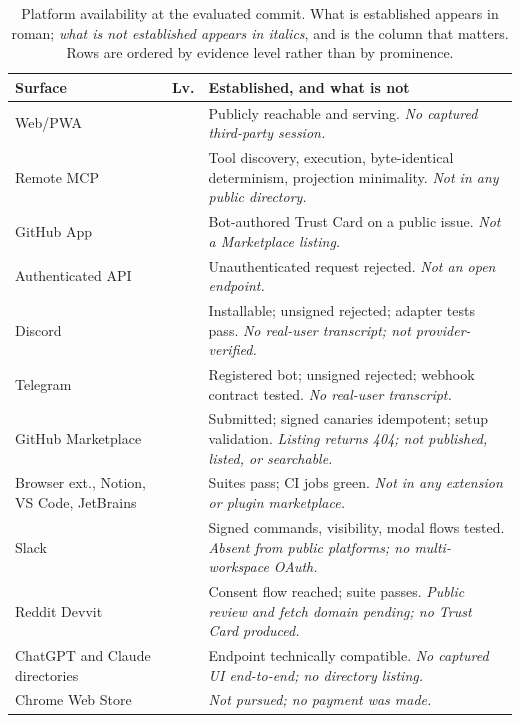 \begin{table}[!b]
\centering
\small
\caption{Platform availability at the evaluated commit. What is established appears in
roman; \emph{what is not established appears in italics}, and is the column that matters.
Rows are ordered by evidence level rather than by prominence.}
\label{tab:platforms}
\setlength{\tabcolsep}{4pt}
\renewcommand{\arraystretch}{1.18}
\begin{tabular}{@{}L{0.245\columnwidth}cL{0.615\columnwidth}@{}}
\toprule
\textbf{Surface} & \textbf{Lv.} & \textbf{Established, and what is not} \\
\midrule
Web/PWA &  & Publicly reachable and serving.
  \emph{No captured third-party session.} \\
Remote MCP &  & Tool discovery, execution, byte-identical determinism, projection
  minimality. \emph{Not in any public directory.} \\
GitHub App &  & Bot-authored Trust Card on a public issue.
  \emph{Not a Marketplace listing.} \\
\midrule
Authenticated API &  & Unauthenticated request rejected.
  \emph{Not an open endpoint.} \\
Discord &  & Installable; unsigned rejected; adapter tests pass.
  \emph{No real-user transcript; not provider-verified.} \\
Telegram &  & Registered bot; unsigned rejected; webhook contract tested.
  \emph{No real-user transcript.} \\
GitHub Marketplace &  & Submitted; signed canaries idempotent; setup validation.
  \emph{Listing returns 404; not published, listed, or searchable.} \\
\midrule
Browser ext., Notion, VS Code, JetBrains &  & Suites pass; CI jobs green.
  \emph{Not in any extension or plugin marketplace.} \\
Slack &  & Signed commands, visibility, modal flows tested.
  \emph{Absent from public platforms; no multi-workspace OAuth.} \\
Reddit Devvit &  & Consent flow reached; suite passes.
  \emph{Public review and fetch domain pending; no Trust Card produced.} \\
\midrule
ChatGPT and Claude directories &  & Endpoint technically compatible.
  \emph{No captured UI end-to-end; no directory listing.} \\
Chrome Web Store &  & \emph{Not pursued; no payment was made.} \\
\bottomrule
\end{tabular}
\end{table}

